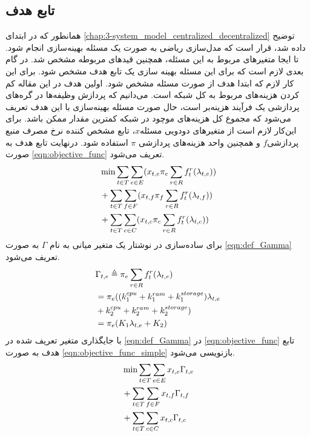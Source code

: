 	\subsection{تابع هدف}
	همانطور که در ابتدای \cref{chap:3-system_model_centralized_decentralized} توضیح داده شد، قرار است که مدل‌سازی ریاضی به صورت یک مسئله بهینه‌سازی انجام شود. تا ایجا متغیرهای مربوط به این مسئله، همچنین قیدهای مربوطه مشخص شد. در گام بعدی لازم است که برای این مسئله بهینه سازی یک تابع هدف مشخص شود. 
	برای این کار لازم که ابتدا هدف از صورت مسئله مشخص شود. اولین هدف در این مقاله کم کردن هزینه‌های مربوط به کل شبکه است. می‌دانیم که پردازش وظیفه‌ها در گره‌های پردازشی یک فرآیند هزینه‌بر است، حال صورت مسئله بهینه‌سازی با این هدف تعریف می‌شود که مجموع کل هزینه‌های موچود در شبکه کمترین مقدار ممکن باشد. برای این‌کار لازم است از متغیرهای دودویی مسئله$x$، تابع مشخص کننده نرخ مصرف منبع پردازشی$f$ و همچنین واحد هزینه‌های پردازشی $\pi$ استفاده شود. درنهایت تابع هدف به صورت \cref{eqn:objective_func} تعریف می‌شود. 
	\begin{align}\label{eqn:objective_func}
		& \notag \min \sum_{t \in T}\sum_{e \in E} (x_{t,e}\pi_e\sum_{r \in R}f_t^r(\lambda_{t,e})) \\
		&\notag + \sum_{t \in T}\sum_{f \in F} (x_{t,f}\pi_f\sum_{r \in R}f_t^r(\lambda_{t,f})) \\
		& + \sum_{t \in T}\sum_{c \in C} (x_{t,c}\pi_c\sum_{r \in R}f_t^r(\lambda_{t,c}))
	\end{align}
	برای ساده‌سازی در نوشتار یک متغیر میانی به نام $\Gamma$ به صورت \cref{eqn:def_Gamma} تعریف می‌شود.
	\begin{align}\label{eqn:def_Gamma}
		&\notag \Gamma_{t,e} \triangleq \pi_e\sum_{r \in R}f_t^r(\lambda_{t,e}) \\
		& = \pi_e((k_1^{cpu}+k_1^{ram}+k_1^{storage})\lambda_{t,e} \notag \\
		&\notag +k_2^{cpu}+k_2^{ram}+k_2^{storage}) \\
		& = \pi_e(K_1\lambda_{t,e}+K_2)
	\end{align}
	با جایگذاری متغیر تعریف شده در \cref{eqn:def_Gamma} در \cref{eqn:objective_func} تابع هدف به صورت  \cref{eqn:objective_func_simple} بازنویسی می‌شود. 
	\begin{align}\label{eqn:objective_func_simple}
		& \notag \min \sum_{t \in T}\sum_{e \in E} x_{t,e}\Gamma_{t,e} \\
		& \notag + \sum_{t \in T}\sum_{f \in F} x_{t,f}\Gamma_{t,f} \\
		& + \sum_{t \in T}\sum_{c \in C} x_{t,c}\Gamma_{t,c}
	\end{align}
